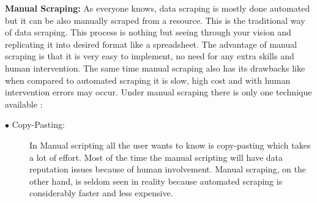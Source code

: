 {\bf Manual Scraping:} As everyone knows, data scraping is mostly done automated but it can be also manually scraped from a resource. This is the traditional way of data scraping. This process is nothing but seeing through your vision and replicating it into desired format like a spreadsheet. The advantage of manual scraping is that it is very easy to implement, no need for any extra skills and human intervention. The same time manual scraping also has its drawbacks like when compared to automated scraping it is slow, high cost and with human intervention errors may occur. Under manual scraping there is only one technique available \cite{Radware}:
\begin{description}
	\item [$\bullet$ Copy-Pasting:] In Manual scripting all the user wants to know is copy-pasting which takes a lot of effort. Most of the time the manual scripting will have data reputation issues because of human involvement. Manual scraping, on the other hand, is seldom seen in reality because automated scraping is considerably faster and less expensive.
\end{description}

